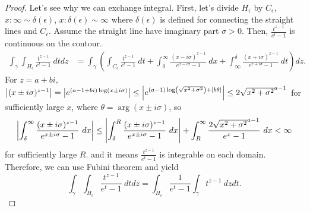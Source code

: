 \documentclass{article}
\begin{document}
\begin{enumerate}
\begin{proof}
Let's see why we can exchange integral. First, let's divide $H_\epsilon$ by $C_\epsilon$, $x:\infty\sim \delta(\epsilon)$, $x:\delta(\epsilon)\sim\infty $ where $\delta(\epsilon)$ is defined for connecting the straight lines and $C_\epsilon$. Assume the straight line have imaginary part $\sigma>0$. Then, $\frac{t^{z-1}}{e^t-1}$ is continuous on the contour.
\begin{equation*}
\begin{split}
\int_\gamma \int_{H_\epsilon} \frac{t^{z-1}}{e^t-1}~dtdz &= \int_\gamma\left( \int_{C_\epsilon} \frac{t^{z-1}}{e^t-1}~dt+\int_{\delta}^\infty \frac{(x-i\sigma)^{z-1}}{e^{x-i\sigma}-1}~dx+\int_\infty^\delta \frac{(x+i\sigma)^{z-1}}{e^{x+i\sigma}-1}~dt\right)dz.
\end{split}
\end{equation*}
For $z=a+bi$, $\abs{(x\pm i\sigma)^{z-1}}=\abs{e^{(a-1+bi)\log(x\pm i\sigma)}}\leq \abs{e^{(a-1)\log(\sqrt{x^2+\sigma^2})+\abs{b\theta}}}\leq 2\sqrt{x^2+\sigma^2}^{a-1}$ for sufficiently large $x$, where $\theta=\arg(x\pm i\sigma)$, so
\begin{equation*}
\abs{\int_{\delta}^\infty \frac{(x\pm i\sigma)^{z-1}}{e^{x\pm i\sigma}-1}~dx}\leq \abs{\int_{\delta}^R \frac{(x\pm i\sigma)^{z-1}}{e^{x\pm i\sigma}-1}~dx}+\int_{R}^\infty \frac{2\sqrt{x^2+\sigma^2}^{a-1}}{e^x-1}~dx<\infty
\end{equation*}
for sufficiently large $R$.
and it means $\frac{t^{z-1}}{e^t-1}$ is integrable on each domain. Therefore, we can use Fubini theorem and yield
\begin{equation*}
\int_\gamma \int_{H_\epsilon} \frac{t^{z-1}}{e^t-1}~dtdz = \int_{H_\epsilon}\frac{1}{e^t-1} \int_\gamma t^{z-1}~dz dt.
\end{equation*}
\end{proof}
\begin{figure}[h]
\centering
{}
\end{figure}
\end{enumerate}
\end{document}
